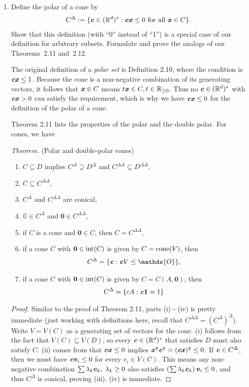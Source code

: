 \documentclass{article}
\begin{document}
\begin{enumerate}
\item Define the polar of a cone by 
\[C^\Delta := \{\textbf{\textit{c}} \in (\mathbb{R}^d)^* : \textbf{\textit{cx}} \le 0 \text{ for all } \textbf{\textit{x}} \in C \}.\] 
Show that this definition (with ``0'' instead of ``1'') is a special case of our definition for arbitrary subsets. Formulate and prove the analogs of our Theorems~2.11 and~2.12.

\begin{solution}
The original definition of a \textit{polar set} is Definition 2.10, where the condition is $\textbf{\textit{cx}} \leq 1$. Because the cone is a non-negative combination of its generating vectors, it follows that $\textbf{\textit{x}} \in C$ means $t\textbf{\textit{x}} \in C, t \in \mathbb{R}_{\geq 0}$. Thus no $\textbf{\textit{c}} \in (\mathbb{R}^d)^*$ with $\textbf{\textit{cx}} > 0$ can satisfy the requirement, which is why we have $\textbf{\textit{cx}} \leq 0$ for the definition of the polar of a cone.

Theorem 2.11 lists the properties of the polar and the double polar. For cones, we have

\textit{Theorem. }(Polar and double-polar cones)
\begin{enumerate}[label=(\roman*)]
    \item $C \subseteq D$ implies $C^\Delta \supseteq D^\Delta$ and $C^{\Delta\Delta} \subseteq D^{\Delta\Delta}$,
    \item $C \subseteq C^{\Delta\Delta}$,
    \item $C^\Delta$ and $C^{\Delta\Delta}$ are conical,
    \item $\mathds{O} \in C^\Delta$ and $\textbf{0} \in C^{\Delta\Delta}$,
    \item if $C$ is a cone and $\textbf{0} \in C$, then $C = C^{\Delta\Delta}$,
    \item if a cone $C$ with $\textbf{0} \in \operatorname{int}(C)$ is given by $C = \operatorname{cone}(V)$, then
    \[C^\Delta = \{\bi{c}: \bi{c}V \leq \mathds{O}\},\]
    \item if a cone $C$ with $\textbf{0} \in \operatorname{int}(C)$ is given by $C = C(A, \textbf{0})$, then
    \[C^\Delta = \{cA: \textbf{\textit{c}}\textbf{1} = 1\}\]
\end{enumerate} 
\begin{proof}
    Similar to the proof of Theorem 2.11, parts (i) - (iv) is pretty immediate (just working with definitions here, recall that $C^{\Delta\Delta} = (C^\Delta)^\Delta$). Write $V = V(C)$ as a generating set of vectors for the cone. (i) follows from the fact that $V(C) \subseteq V(D)$, so every $\textbf{\textit{c}} \in (\mathbb{R}^d)^*$ that satisfies $D$ must also satisfy $C$. (ii) comes from that $\textbf{\textit{cx}} \leq 0$ implies $\textbf{\textit{x}}^\intercal\textbf{\textit{c}}^\intercal = (\textbf{\textit{cx}})^\intercal \leq 0$. If $\textbf{\textit{c}} \in C^\Delta$, then we must have $\textbf{\textit{cv}}_i \leq 0$ for every $v_i \in V(C)$. This means any non-negative combination $\sum\lambda_k\textbf{\textit{c}}_k, \; \lambda_k \geq 0$ also satisfies $\left(\sum\lambda_k\textbf{\textit{c}}_k\right)\textbf{\textit{v}}_i \leq 0$, and thus $C^\Delta$ is conical, proving (iii). (iv) is immediate. 
    

\end{proof}
\end{solution}
\end{enumerate}
\end{document}
